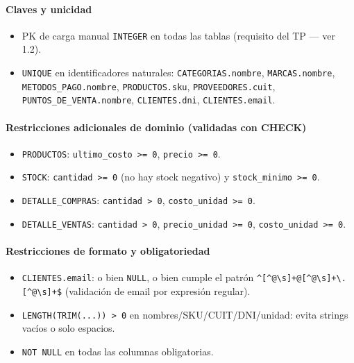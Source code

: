 \documentclass[11pt,a4paper]{article}
\begin{document}
\paragraph{Claves y unicidad}
\begin{itemize}[nosep]
    \item PK de carga manual \texttt{INTEGER} en todas las tablas (requisito del TP — ver 1.2).
    \item \texttt{UNIQUE} en identificadores naturales: \texttt{CATEGORIAS.nombre},
    \texttt{MARCAS.nombre}, \texttt{METODOS\_PAGO.nombre}, \texttt{PRODUCTOS.sku},
    \texttt{PROVEEDORES.cuit}, \texttt{PUNTOS\_DE\_VENTA.nombre}, \texttt{CLIENTES.dni},
    \texttt{CLIENTES.email}.
\end{itemize}

\paragraph{Restricciones adicionales de dominio (validadas con CHECK)}
\begin{itemize}[nosep]
    \item \texttt{PRODUCTOS}: \texttt{ultimo\_costo >= 0}, \texttt{precio >= 0}.
    \item \texttt{STOCK}: \texttt{cantidad >= 0} (no hay stock negativo) y \texttt{stock\_minimo >= 0}.
    \item \texttt{DETALLE\_COMPRAS}: \texttt{cantidad > 0}, \texttt{costo\_unidad >= 0}.
    \item \texttt{DETALLE\_VENTAS}: \texttt{cantidad > 0}, \texttt{precio\_unidad >= 0}, \texttt{costo\_unidad >= 0}.
\end{itemize}

\paragraph{Restricciones de formato y obligatoriedad}
\begin{itemize}[nosep]
    \item \texttt{CLIENTES.email}: o bien \texttt{NULL}, o bien cumple el patrón
    \verb|^[^@\s]+@[^@\s]+\.[^@\s]+$| (validación de email por expresión regular).
    \item \texttt{LENGTH(TRIM(...)) > 0} en nombres/SKU/CUIT/DNI/unidad: evita strings
    vacíos o solo espacios.
    \item \texttt{NOT NULL} en todas las columnas obligatorias.
\end{itemize}
\end{document}
